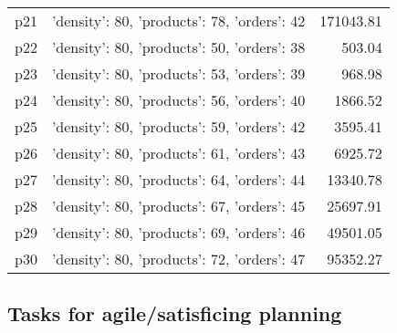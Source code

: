 \documentclass{article}
\begin{document}
\begin{center}
\begin{tabular}{@{}l|r|r@{}}
  p21&{'density': 80, 'products': 78, 'orders': 42}&171043.81\\
  p22&{'density': 80, 'products': 50, 'orders': 38}&503.04\\
  p23&{'density': 80, 'products': 53, 'orders': 39}&968.98\\
  p24&{'density': 80, 'products': 56, 'orders': 40}&1866.52\\
  p25&{'density': 80, 'products': 59, 'orders': 42}&3595.41\\
  p26&{'density': 80, 'products': 61, 'orders': 43}&6925.72\\
  p27&{'density': 80, 'products': 64, 'orders': 44}&13340.78\\
  p28&{'density': 80, 'products': 67, 'orders': 45}&25697.91\\
  p29&{'density': 80, 'products': 69, 'orders': 46}&49501.05\\
  p30&{'density': 80, 'products': 72, 'orders': 47}&95352.27
                            \end{tabular}
                            \end{center}
                    

                                \subsection*{Tasks for agile/satisficing planning}
                                
\end{document}
